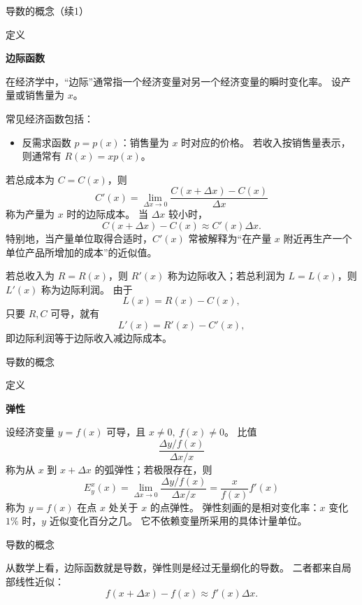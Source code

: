 \documentclass[aspectratio=169,10pt,fontset=fandol]{ctexbeamer}
\begin{document}
\begin{frame}[t,fragile]{导数的概念（续1）}
\footnotesize
\begin{block}{定义}
{\footnotesize
\textbf{边际函数}\par

在经济学中，“边际”通常指一个经济变量对另一个经济变量的瞬时变化率。 设产量或销售量为 $x$。

常见经济函数包括：
\begin{itemize}[leftmargin=2em]
\item 反需求函数 $p=p(x)$：销售量为 $x$ 时对应的价格。 若收入按销售量表示，则通常有 $R(x)=xp(x)$。
\end{itemize}

若总成本为 $C=C(x)$，则
\[
C'(x)=\lim_{\Delta x\to0}\frac{C(x+\Delta x)-C(x)}{\Delta x}
\]
称为产量为 $x$ 时的边际成本。 当 $\Delta x$ 较小时，
\[
C(x+\Delta x)-C(x)\approx C'(x)\Delta x.
\]
特别地，当产量单位取得合适时，$C'(x)$ 常被解释为“在产量 $x$ 附近再生产一个单位产品所增加的成本”的近似值。

若总收入为 $R=R(x)$，则 $R'(x)$ 称为边际收入；若总利润为 $L=L(x)$，则 $L'(x)$ 称为边际利润。 由于
\[
L(x)=R(x)-C(x),
\]
只要 $R,C$ 可导，就有
\[
L'(x)=R'(x)-C'(x),
\]
即边际利润等于边际收入减边际成本。

}
\end{block}
\end{frame}
\begin{frame}[t,fragile]{导数的概念}
\normalsize
\begin{block}{定义}
{\normalsize
\textbf{弹性}\par

设经济变量 $y=f(x)$ 可导，且 $x\neq0,\ f(x)\neq0$。 比值
\[
\frac{\Delta y/f(x)}{\Delta x/x}
\]
称为从 $x$ 到 $x+\Delta x$ 的弧弹性；若极限存在，则
\[
E_y^x(x)=\lim_{\Delta x\to0}\frac{\Delta y/f(x)}{\Delta x/x}
=\frac{x}{f(x)}f'(x)
\]
称为 $y=f(x)$ 在点 $x$ 处关于 $x$ 的点弹性。 弹性刻画的是相对变化率：$x$ 变化 $1\%$ 时，$y$ 近似变化百分之几。 它不依赖变量所采用的具体计量单位。

}
\end{block}
\end{frame}
\begin{frame}[t,fragile]{导数的概念}
\normalsize
{\normalsize
从数学上看，边际函数就是导数，弹性则是经过无量纲化的导数。 二者都来自局部线性近似：
\[
f(x+\Delta x)-f(x)\approx f'(x)\Delta x.
\]


}
\end{frame}
\end{document}
